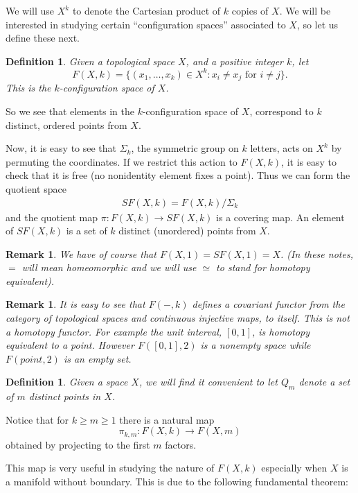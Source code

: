 \documentclass{amsart}
\newtheorem{rem}[thm]{Remark}
\newtheorem{defn}[thm]{Definition}
\newcommand{\pikm}{\pi_{k,m}}
\begin{document}
	We will use $X^k$ to denote the Cartesian product of $k$ copies
of $X$. We will be interested in studying certain
``configuration spaces''
associated to $X$, so let us define these next.

\begin{defn}
\label{defn: configuration}
Given a topological space $X$, and a positive integer $k$, let 
$$
F(X,k) = \{ (x_1,\dots,x_k) \in X^k : x_i \neq x_j \text{ for } i \neq j \}.
$$
This is the $k$-configuration space of $X$.
\end{defn}

So we see that elements in the $k$-configuration space of $X$, correspond
to $k$ distinct, ordered points from $X$.

Now, it is easy to see that $\Sigma_k$, the symmetric group on $k$ letters,
acts on $X^k$ by permuting the coordinates. If we restrict this action
to $F(X,k)$, it is easy to check that it is free (no nonidentity element
fixes a point). Thus we can form the quotient space 
\begin{align}
\label{symconfig}
SF(X,k) = F(X,k)/\Sigma_k
\end{align}
and the quotient map $\pi : F(X,k) \rightarrow SF(X,k)$ is a covering map.
An element of $SF(X,k)$ is a set of $k$ distinct (unordered) points from $X$.

\begin{rem}
We have of course that $F(X,1)=SF(X,1)=X$.
(In these notes, $=$ will mean homeomorphic and we will use $\simeq$ to
stand for homotopy equivalent).
\end{rem}

\begin{rem}
It is easy to see that $F(-,k)$ defines a covariant
functor from the category of topological spaces and continuous
injective maps, to itself. This is not a homotopy functor. For example
the unit interval, $[0,1]$, is homotopy equivalent to a point. However
$F([0,1],2)$ is a nonempty space while $F(point,2)$ is an
empty set.
\end{rem}

\begin{defn}
Given a space $X$, we will find it convenient to let $Q_m$ denote a set
of $m$ distinct points in $X$.
\end{defn}

Notice that for $k \geq m \geq 1$ there is a natural map 
$$
\pikm : F(X,k) \rightarrow F(X,m)
$$
obtained by projecting to the first $m$ factors. 

This map is very useful in studying the nature of $F(X,k)$ especially
when $X$ is a manifold without boundary. This is due to the following
fundamental theorem:
\end{document}
